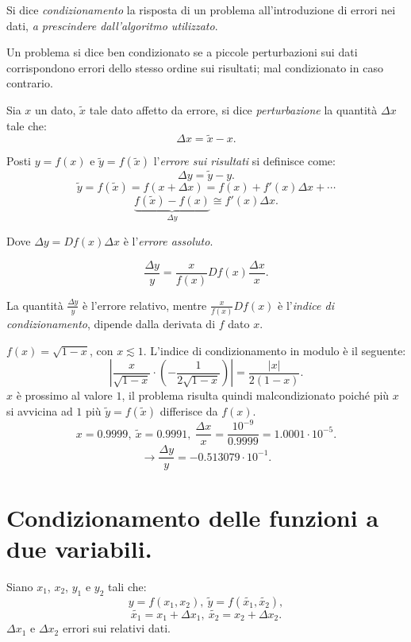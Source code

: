 \begin{defi}
Si dice \emph{condizionamento} la risposta di un problema all'introduzione di 
errori nei dati, \emph{a prescindere dall'algoritmo utilizzato}.
\end{defi}

\begin{defi}
Un problema si dice ben condizionato se a piccole perturbazioni sui dati 
corrispondono errori dello stesso ordine sui risultati; mal condizionato in
caso contrario.
\end{defi}

\begin{defi}
Sia $x$ un dato, $\tilde{x}$ tale dato affetto da errore, si dice
\emph{perturbazione} la quantità $\Delta x$ tale che:
\[\Delta x = \tilde{x} - x.\]

Posti $y = f(x)$ e $\tilde{y} = f(\tilde{x})$ l'\emph{errore sui risultati} si
definisce come:
\[\Delta y = \tilde{y} - y.\]
\[\tilde{y} = f(\tilde{x}) = f(x + \Delta x) = f(x) + f'(x)\Delta x + 
\cdots\]
\[\underbrace{f(\tilde{x}) - f(x)}_{\Delta y} \cong f'(x)\Delta x. \]

Dove $\Delta y = Df(x)\Delta x$ è l'\emph{errore assoluto}.

\[\frac{\Delta y}{y} = \frac{x}{f(x)}Df(x)\frac{\Delta x}{x}.\]

La quantità $\frac{\Delta y}{y}$ è l'errore relativo, mentre $\frac{x}{f(x)}
Df(x)$ è l'\emph{indice di condizionamento}, dipende dalla derivata di $f$
dato $x$.
\end{defi} 

\begin{exe}
$f(x) = \sqrt{1 - x}$, con $x \lesssim 1$. L'indice di condizionamento in 
modulo è il seguente:
\[
\left| \frac{x}{\sqrt{1 - x}}\cdot 
\left(-\frac{1}{2\sqrt{1 - x}}\right)\right| = \frac{|x|}{2(1-x)}.
\]
$x$ è prossimo al valore $1$, il problema risulta quindi malcondizionato
poiché più $x$ si avvicina ad $1$ più $\tilde{y} = f(\tilde{x})$ differisce
da $f(x)$.
\[
x = 0.9999, \ \tilde{x} = 0.9991, \ \frac{\Delta x}{x} = 
\frac{10^{-9}}{0.9999} = 1.0001 \cdot 10^{-5}.
\]
\[\longrightarrow \frac{\Delta y}{y} = -0.513079 \cdot 10^{-1}.\]
\end{exe}

\section{Condizionamento delle funzioni a due variabili.}
Siano $x_1$, $x_2$, $y_1$ e $y_2$ tali che:
\[y = f(x_1,x_2), \ \tilde{y} = f(\tilde{x_1},\tilde{x_2}), \]
\[
\tilde{x_1}= x_1 + \Delta x_1,\ \tilde{x_2}= x_2 + \Delta x_2.
\]
$\Delta x_1$ e $\Delta x_2$ errori sui relativi dati.

